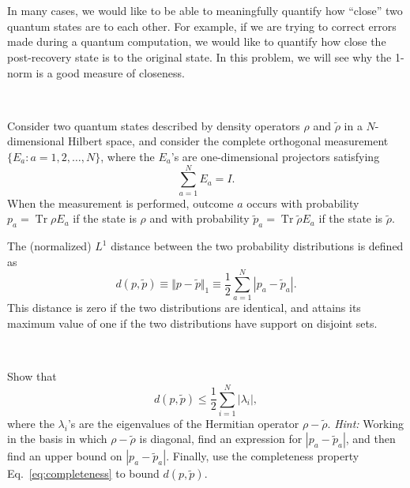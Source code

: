 \documentclass[a4paper,11pt]{article}
\DeclareMathOperator{\Tr}{Tr}
\begin{document}
~



~

In many cases, we would like to be able to meaningfully quantify how ``close'' two quantum states are to each other.
For example, if we are trying to correct errors made during a quantum computation, we would like to quantify how close the post-recovery state is to the original state.
In this problem, we will see why the 1-norm is a good measure of closeness.

~

Consider two quantum states described by density operators $\rho$ and $\tilde \rho$ in a $N$-dimensional Hilbert space, and consider the complete orthogonal measurement $\{E_a : a = 1, 2, \dots, N\}$, where the $E_a$'s are one-dimensional projectors satisfying
\begin{equation} \label{eq:completeness}
\sum_{a=1}^N E_a = I. 
\end{equation}
When the measurement is performed, outcome $a$ occurs with probability $p_a = \Tr \rho E_a$ if the state is $\rho$ and with probability $\tilde p_a = \Tr \tilde{\rho} E_a$ if the state is $\tilde \rho$.

The (normalized) $L^1$ distance between the two probability distributions is defined as
\begin{equation}
d(p,\tilde{p}) \equiv \Vert p - \tilde{p} \Vert_1 \equiv \frac{1}{2} \sum_{a=1}^N |p_a - \tilde p_a|.
\end{equation}
This distance is zero if the two distributions are identical, and attains its maximum value of one if the two distributions have support on disjoint sets.

~

 Show that
\begin{equation} \label{eq:bound}
d(p,\tilde{p}) \leq \frac{1}{2} \sum_{i=1}^N |\lambda_i|,
\end{equation}
where the $\lambda_i$'s are the eigenvalues of the Hermitian operator $\rho - \tilde{\rho}$.
\textit{Hint:} Working in the basis in which $\rho - \tilde{\rho}$ is diagonal, find an expression for $|p_a - \tilde{p}_a|$, and then find an upper bound on $|p_a - \tilde{p}_a|$.
Finally, use the completeness property Eq.~\eqref{eq:completeness} to bound $d(p,\tilde{p})$.
\end{document}
